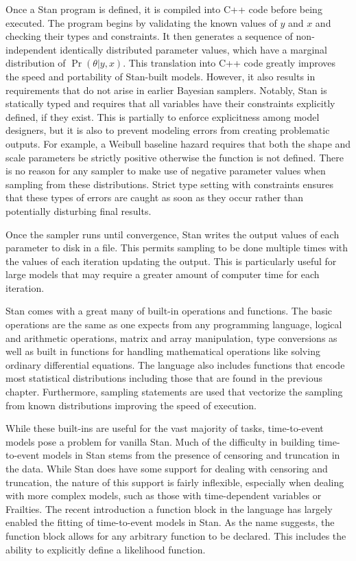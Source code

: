 Once a Stan program is defined, it is compiled into C++ code before being executed. The program begins by validating the known values of $y$ and $x$ and checking their types and constraints. It then generates a sequence of non-independent identically distributed parameter values, which have a marginal distribution of $\Pr(\theta|y,x)$. This translation into C++ code greatly improves the speed and portability of Stan-built models. However, it also results in requirements that do not arise in earlier Bayesian samplers. Notably, Stan is statically typed and requires that all variables have their constraints explicitly defined, if they exist. This is partially to enforce explicitness among model designers, but it is also to prevent modeling errors from creating problematic outputs. For example, a Weibull baseline hazard requires that both the shape and scale parameters be strictly positive otherwise the function is not defined. There is no reason for any sampler to make use of negative parameter values when sampling from these distributions. Strict type setting with constraints ensures that these types of errors are caught as soon as they occur rather than potentially disturbing final results. 

Once the sampler runs until convergence, Stan writes the output values of each parameter to disk in a  file. This permits sampling to be done multiple times with the values of each iteration updating the output. This is particularly useful for large models that may require a greater amount of computer time for each iteration.

Stan comes with a great many of built-in operations and functions. The basic operations are the same as one expects from any programming language, logical and arithmetic operations, matrix and array manipulation, type conversions as well as built in functions for handling mathematical operations like solving ordinary differential equations. The language also includes functions that encode most statistical distributions including those that are found in the previous chapter. Furthermore, sampling statements are used that vectorize the sampling from known distributions improving the speed of execution. 

While these built-ins are useful for the vast majority of tasks, time-to-event models pose a problem for vanilla Stan. Much of the difficulty in building time-to-event models in Stan stems from the presence of censoring and truncation in the data. While Stan does have some support for dealing with censoring and truncation, the nature of this support is fairly inflexible, especially when dealing with more complex models, such as those with time-dependent variables or Frailties. The recent introduction a function block in the language has largely enabled the fitting of time-to-event models in Stan. As the name suggests, the function block allows for any arbitrary function to be declared. This includes the ability to explicitly define a likelihood function.

